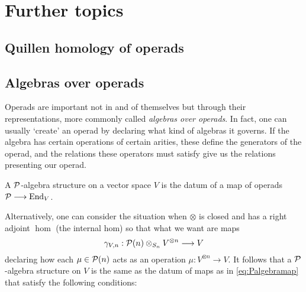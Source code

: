 

\section{Further topics}

\subsection{Quillen homology of operads}


\begin{lemma}
  \end{lemma}
  
  \begin{definition}
  \end{definition}
  
  \begin{definition}
  \end{definition}
  
  \begin{proposition}
  \end{proposition}
\subsection{Algebras over operads}
Operads are important not in and of themselves 
but through their representations, more commonly
called \emph{algebras over operads}. In fact,
one can usually `create' an operad by declaring
what kind of algebras it governs. If the
algebra has certain operations of certain
arities, these define the generators of the operad,
and the relations these operators must satisfy 
give us the relations presenting our operad. 

\begin{definition}
A ${\mathcal{P}}$-algebra structure on a vector
space $V$ is the datum of a map of operads 
${\mathcal{P}} \longrightarrow \operatorname{End}_V$.
\end{definition}

Alternatively, one can consider the situation
when $\otimes$ is closed and has a right
adjoint $\hom$ (the internal hom) so that
what we want are maps
\[\label{eq:Palgebramap}
\gamma_{V,n} : 
{\mathcal{P}}(n)\otimes_{S_n} V^{\otimes n} \longrightarrow V \]
declaring how each $\mu \in{\mathcal{P}}(n)$ acts as an operation
$\mu : V^{\otimes n} \longrightarrow V$. 
It follows that a
 ${\mathcal{P}}$-algebra structure on $V$ is the same as the datum
of maps as in \ref{eq:Palgebramap} that satisfy the following
conditions:

